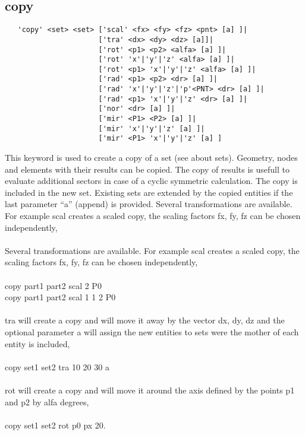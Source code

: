 \documentclass{article}
\begin{document}
\subsection{\label{copy}copy}
\begin{verbatim}
   'copy' <set> <set> ['scal' <fx> <fy> <fz> <pnt> [a] ]|
                      ['tra' <dx> <dy> <dz> [a]]|
                      ['rot' <p1> <p2> <alfa> [a] ]|
                      ['rot' 'x'|'y'|'z' <alfa> [a] ]|
                      ['rot' <p1> 'x'|'y'|'z' <alfa> [a] ]|
                      ['rad' <p1> <p2> <dr> [a] ]|
                      ['rad' 'x'|'y'|'z'|'p'<PNT> <dr> [a] ]|
                      ['rad' <p1> 'x'|'y'|'z' <dr> [a] ]|
                      ['nor' <dr> [a] ]|
                      ['mir' <P1> <P2> [a] ]| 
                      ['mir' 'x'|'y'|'z' [a] ]| 
                      ['mir' <P1> 'x'|'y'|'z' [a] ] 
\end{verbatim}
This keyword is used to create a copy of a set (see  about sets). Geometry, nodes and elements with their results can be copied. The copy of results is usefull to evaluate additional sectors in case of a cyclic symmetric calculation. The copy is included in the new set. Existing sets are extended by the copied entities if the last parameter ``a'' (append) is provided. Several transformations are available. For example scal creates a scaled copy, the scaling factors fx, fy, fz can be chosen independently,\\\\
Several transformations are available. For example scal creates a scaled copy, the scaling factors fx, fy, fz can be chosen independently,\\\\
copy part1 part2 scal 2 P0 \\
copy part1 part2 scal 1 1 2 P0\\\\
tra will create a copy and will move it away by the vector dx, dy, dz and the optional parameter a will assign the new entities to sets were the mother of each entity is included,\\\\
copy set1 set2 tra 10 20 30 a\\\\
rot will create a copy and will move it around the axis defined by the points p1 and p2 by alfa degrees,\\\\
copy set1 set2 rot p0 px 20.\\\\
\end{document}
